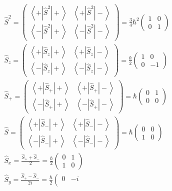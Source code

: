 \documentclass[__minimum__.tex]{subfiles}
\begin{document}
	\begin{gather}
	\hat{S}^2 = \left(\begin{matrix}
	\left<+|\hat{S}^2|+\right> & \left<+|\hat{S}^2|-\right> \\
	\left<-|\hat{S}^2|+\right> & \left<-|\hat{S}^2|-\right>
	\end{matrix}\right) = \frac{3}{4}\hbar^2
	\left(\begin{matrix}
	1 & 0\\
	0 & 1
	\end{matrix}\right)\\
	\hat{S}_z = \left(\begin{matrix}
	\left<+|\hat{S}_z|+\right> & \left<+|\hat{S}_z|-\right> \\
	\left<-|\hat{S}_z|+\right> & \left<-|\hat{S}_z|-\right>
	\end{matrix}\right) = \frac{\hbar}{2}
	\left(\begin{matrix}
	1 & 0\\
	0 & -1
	\end{matrix}\right)\\
	\hat{S}_+ = \left(\begin{matrix}
	\left<+|\hat{S}_+|+\right> & \left<+|\hat{S}_+|-\right> \\
	\left<-|\hat{S}_+|+\right> & \left<-|\hat{S}_+|-\right>
	\end{matrix}\right) = \hbar
	\left(\begin{matrix}
	0 & 1\\
	0 & 0
	\end{matrix}\right)\\
	\hat{S} = \left(\begin{matrix}
	\left<+|\hat{S}_-|+\right> & \left<+|\hat{S}_-|-\right> \\
	\left<-|\hat{S}_-|+\right> & \left<-|\hat{S}_-|-\right>
	\end{matrix}\right) = \hbar
	\left(\begin{matrix}
	0 & 0\\
	1 & 0
	\end{matrix}\right)\\
	\hat{S}_x = \frac{\hat{S}_+ + \hat{S}_-}{2} = \frac{\hbar}{2} \left(\begin{matrix}
	0 & 1\\
	1 & 0
	\end{matrix}\right)\\
	\hat{S}_y =\frac{\hat{S}_+ - \hat{S}_-}{2i} = \frac{\hbar}{2} \left(\begin{matrix}
	0 & -i\\

\end{matrix}
\end{gather}
\end{document}
